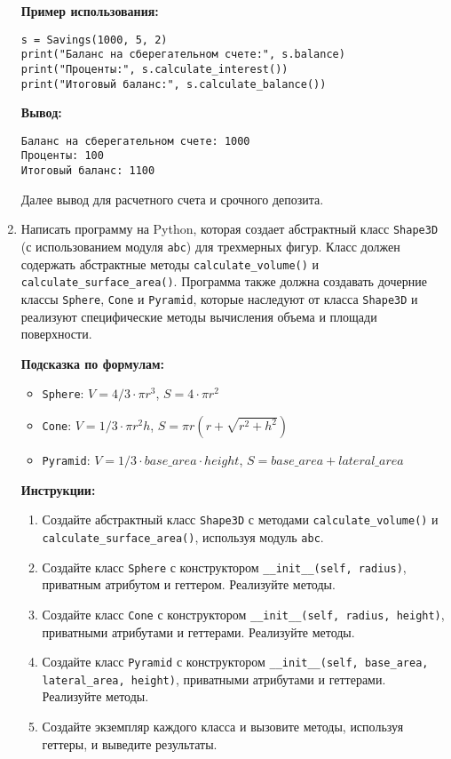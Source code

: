 \begin{enumerate}
\textbf{Пример использования:}
\begin{verbatim}
s = Savings(1000, 5, 2)
print("Баланс на сберегательном счете:", s.balance)
print("Проценты:", s.calculate_interest())
print("Итоговый баланс:", s.calculate_balance())
\end{verbatim}

\textbf{Вывод:}
\begin{verbatim}
Баланс на сберегательном счете: 1000
Проценты: 100
Итоговый баланс: 1100
\end{verbatim}

Далее вывод для расчетного счета и срочного депозита.

\item
Написать программу на Python, которая создает абстрактный класс \texttt{Shape3D} (с использованием модуля \texttt{abc}) для трехмерных фигур. 
Класс должен содержать абстрактные методы \texttt{calculate\_volume()} и \texttt{calculate\_surface\_area()}. 
Программа также должна создавать дочерние классы \texttt{Sphere}, \texttt{Cone} и \texttt{Pyramid}, 
которые наследуют от класса \texttt{Shape3D} и реализуют специфические методы вычисления объема и площади поверхности.

\textbf{Подсказка по формулам:}
\begin{itemize}
    \item \texttt{Sphere}: $V = 4/3 \cdot \pi r^3$, $S = 4 \cdot \pi r^2$
    \item \texttt{Cone}: $V = 1/3 \cdot \pi r^2 h$, $S = \pi r (r + \sqrt{r^2 + h^2})$
    \item \texttt{Pyramid}: $V = 1/3 \cdot base\_area \cdot height$, $S = base\_area + lateral\_area$
\end{itemize}

\textbf{Инструкции:}
\begin{enumerate}
    \item Создайте абстрактный класс \texttt{Shape3D} с методами \texttt{calculate\_volume()} и \texttt{calculate\_surface\_area()}, используя модуль \texttt{abc}.
    \item Создайте класс \texttt{Sphere} с конструктором \texttt{\_\_init\_\_(self, radius)}, приватным атрибутом и геттером. Реализуйте методы.
    \item Создайте класс \texttt{Cone} с конструктором \texttt{\_\_init\_\_(self, radius, height)}, приватными атрибутами и геттерами. Реализуйте методы.
    \item Создайте класс \texttt{Pyramid} с конструктором \texttt{\_\_init\_\_(self, base\_area, lateral\_area, height)}, приватными атрибутами и геттерами. Реализуйте методы.
    \item Создайте экземпляр каждого класса и вызовите методы, используя геттеры, и выведите результаты.
\end{enumerate}


\end{enumerate}
